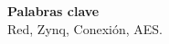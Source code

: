 \begin{center}
	\bigskip
	\bigskip
	\textbf{\huge {Palabras clave}}\\
	\bigskip
	Red, Zynq, Conexión, AES.
\end{center}